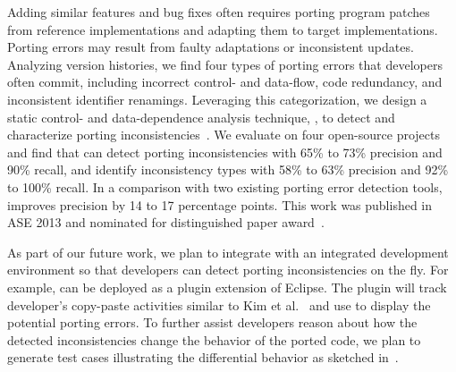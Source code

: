 \documentclass[a4paper, 11pt]{article}
\begin{document}
\begin{small}
Adding similar features and bug fixes often requires porting program patches from reference implementations and adapting them to target
implementations. Porting errors may result from faulty adaptations or inconsistent updates. 
Analyzing version histories, we find four types of porting errors that developers often commit, including incorrect control- and
data-flow, code redundancy, and inconsistent identifier renamings. Leveraging this categorization, we design a static control- and
data-dependence analysis technique, {\spa}, to detect and characterize porting inconsistencies~\cite{ray2013detecting}. 
We evaluate {\spa} on four open-source projects and find that {\spa} can detect porting inconsistencies with
65\% to 73\% precision and 90\% recall, and identify inconsistency types with 58\% to 63\% precision and 92\% to 100\% recall. 
In a comparison with two existing porting error detection tools, {\spa} improves precision by 14 to 17 percentage points.
This work was published in ASE 2013 and nominated for distinguished paper award~\cite{ray2013detecting}.

As part of our future work, we plan to integrate {\spa} with an integrated development environment so
 that developers can detect porting inconsistencies on the fly. For example, {\spa} can be deployed as a plugin extension of Eclipse. The plugin will track developer's copy-paste activities similar to Kim et al.~\cite{Kim2004} and use {\spa} to display the potential porting errors. To further assist developers reason about how the detected inconsistencies change the behavior of the ported code, we plan to generate test cases illustrating the differential behavior as sketched in~\cite{rayThesis}.


\end{small}
\end{document}

